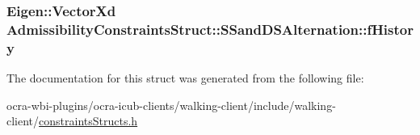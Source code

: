 \hypertarget{structAdmissibilityConstraintsStruct_1_1SSandDSAlternation_abacb8f39b18c0960834a0ebc1d46ba28}{
\subsubsection[{f\-History}]{\setlength{\rightskip}{0pt plus 5cm}\-Eigen\-::\-Vector\-Xd {\bf \-Admissibility\-Constraints\-Struct\-::\-S\-Sand\-D\-S\-Alternation\-::f\-History}}}\label{structAdmissibilityConstraintsStruct_1_1SSandDSAlternation_abacb8f39b18c0960834a0ebc1d46ba28}


\-The documentation for this struct was generated from the following file\-:\begin{DoxyCompactItemize}
\item 
ocra-\/wbi-\/plugins/ocra-\/icub-\/clients/walking-\/client/include/walking-\/client/\hyperlink{constraintsStructs_8h}{constraints\-Structs.\-h}\end{DoxyCompactItemize}

